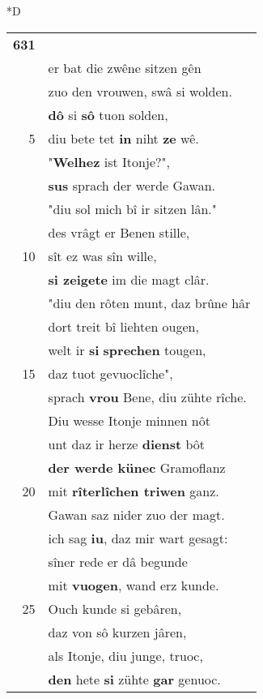 \documentclass[8pt,a4paper,notitlepage]{article}
\begin{document}
\begin{table}[ht]
\begin{minipage}[t]{0.5\linewidth}
\small
\begin{center}*D
\end{center}
\begin{tabular}{rl}
\textbf{631} & \textit{\begin{large}D\end{large}}er wirt niht langer wolde stên;\\ 
 & er bat die zwêne sitzen gên\\ 
 & zuo den vrouwen, swâ si wolden.\\ 
 & \textbf{dô} si \textbf{sô} tuon solden,\\ 
5 & diu bete tet \textbf{in} niht \textbf{ze} wê.\\ 
 & "\textbf{Welhez} ist Itonje?",\\ 
 & \textbf{sus} sprach der werde Gawan.\\ 
 & "diu sol mich bî ir sitzen lân."\\ 
 & des vrâgt er Benen stille,\\ 
10 & sît ez was sîn wille,\\ 
 & \textbf{si zeigete} im die magt clâr.\\ 
 & "diu den rôten munt, daz brûne hâr\\ 
 & dort treit bî liehten ougen,\\ 
 & welt ir \textbf{si} \textbf{sprechen} tougen,\\ 
15 & daz tuot gevuoclîche",\\ 
 & sprach \textbf{vrou} Bene, diu zühte rîche.\\ 
 & Diu wesse Itonje minnen nôt\\ 
 & unt daz ir herze \textbf{dienst} bôt\\ 
 & \textbf{der werde künec} Gramoflanz\\ 
20 & mit \textbf{rîterlîchen triwen} ganz.\\ 
 & Gawan saz nider zuo der magt.\\ 
 & ich sag \textbf{iu}, daz mir wart gesagt:\\ 
 & sîner rede er dâ begunde\\ 
 & mit \textbf{vuogen}, wand erz kunde.\\ 
25 & Ouch kunde si gebâren,\\ 
 & daz von sô kurzen jâren,\\ 
 & als Itonje, diu junge, truoc,\\ 
 & \textbf{den} hete \textbf{si} zühte \textbf{gar} genuoc.\\ 

\end{tabular}
\end{minipage}
\end{table}
\end{document}
